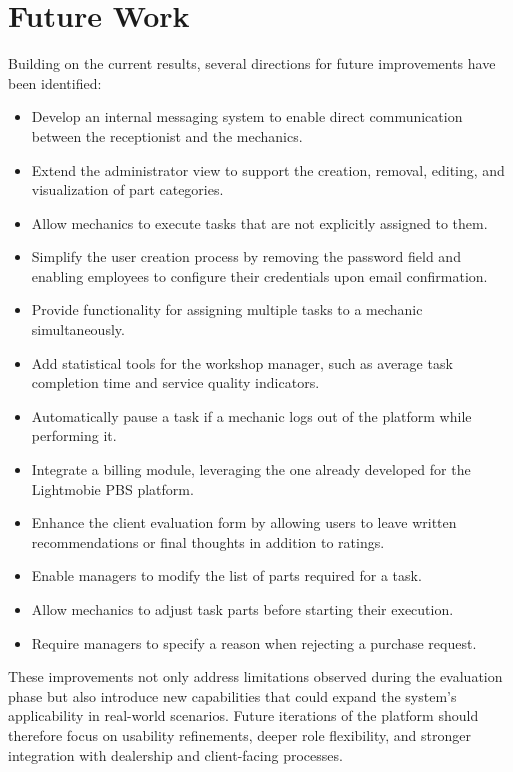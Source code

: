 \section{Future Work}

Building on the current results, several directions for future improvements have been identified:

\begin{itemize}
    \item Develop an internal messaging system to enable direct communication between the receptionist and the mechanics.
    \item Extend the administrator view to support the creation, removal, editing, and visualization of part categories.
    \item Allow mechanics to execute tasks that are not explicitly assigned to them.
    \item Simplify the user creation process by removing the password field and enabling employees to configure their credentials upon email confirmation.
    \item Provide functionality for assigning multiple tasks to a mechanic simultaneously.
    \item Add statistical tools for the workshop manager, such as average task completion time and service quality indicators.
    \item Automatically pause a task if a mechanic logs out of the platform while performing it.
    \item Integrate a billing module, leveraging the one already developed for the Lightmobie \acs{PBS} platform.
    \item Enhance the client evaluation form by allowing users to leave written recommendations or final thoughts in addition to ratings.
    \item Enable managers to modify the list of parts required for a task.
    \item Allow mechanics to adjust task parts before starting their execution.
    \item Require managers to specify a reason when rejecting a purchase request.
\end{itemize}

These improvements not only address limitations observed during the evaluation phase but also introduce new capabilities that could expand the system's applicability in real-world scenarios. Future iterations of the platform should therefore focus on usability refinements, deeper role flexibility, and stronger integration with dealership and client-facing processes.
 